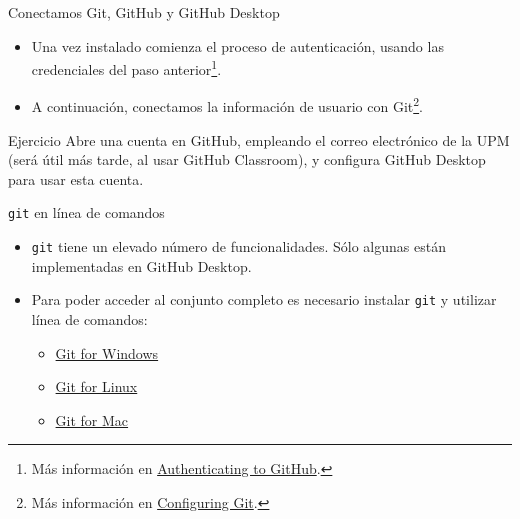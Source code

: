 \documentclass[aspectratio=169, xcolor={usenames,svgnames,dvipsnames}]{beamer}
\begin{document}
\begin{frame}[label={sec:orgc7197d4}]{Conectamos Git, GitHub y GitHub Desktop}
\begin{itemize}
\item Una vez instalado comienza el proceso de autenticación, usando las credenciales del paso anterior\footnote{Más información en \href{https://help.github.com/desktop/guides/getting-started-with-github-desktop/authenticating-to-github/}{Authenticating to GitHub}.}.
\end{itemize}

\begin{center}
\end{center}


\begin{itemize}
\item A continuación, conectamos la información de usuario con Git\footnote{Más información en \href{https://help.github.com/desktop/guides/getting-started-with-github-desktop/configuring-git-for-github-desktop/}{Configuring Git}.}.
\end{itemize}

\begin{center}
\end{center}
\end{frame}

\begin{frame}[label={sec:org28c34fb}]{}
\begin{block}{Ejercicio}
Abre una cuenta en GitHub, empleando el correo electrónico de la UPM (será útil más tarde, al usar GitHub Classroom), y configura GitHub Desktop para usar esta cuenta.
\end{block}
\end{frame}

\begin{frame}[fragile,label={sec:orgb5680b9}]{\texttt{git} en línea de comandos}
 \begin{itemize}
\item \texttt{git} tiene un elevado número de funcionalidades. Sólo algunas están implementadas en GitHub Desktop.
\item Para poder acceder al conjunto completo es necesario instalar \texttt{git} y utilizar línea de comandos:
\begin{itemize}
\item \href{https://gitforwindows.org/}{Git for Windows}
\item \href{http://git-scm.com/download/linux}{Git for Linux}
\item \href{http://git-scm.com/download/mac}{Git for Mac}
\end{itemize}
\end{itemize}
\end{frame}
\end{document}
